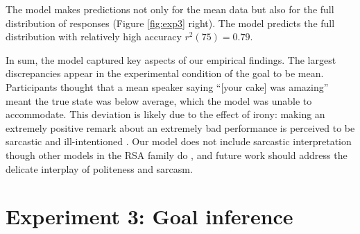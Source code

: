 \documentclass[10pt,letterpaper]{article}
\newcommand{\ndg}[1]{\textcolor{Green}{[ndg: #1]}}
\newcommand{\mht}[1]{\textcolor{DarkOrange}{[mht: #1]}}
\begin{document}
The model makes predictions not only for the mean data but also for the full distribution of responses (Figure \ref{fig:exp3} right).
The model predicts the full distribution with relatively high accuracy $r^2(75) = 0.79$.

In sum, the model captured key aspects of our empirical findings.
The largest discrepancies appear in the experimental condition of the goal to be mean.
Participants thought that a mean speaker saying ``[your cake] was amazing'' meant the true state was below average, which the model was unable to accommodate.
This deviation is likely due to the effect of irony: making an extremely positive remark about an extremely bad performance is perceived to be sarcastic and ill-intentioned \cite{colston1997}.
Our model does not include sarcastic interpretation though other models in the RSA family do \cite{Kao2015}, and future work should address the delicate interplay of politeness and sarcasm.


\section{Experiment 3: Goal inference}
\end{document}
